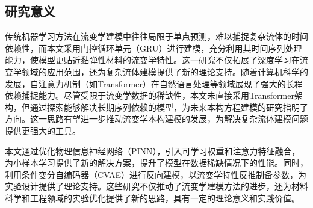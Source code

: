 \subsection{研究意义}
传统机器学习方法在流变学建模中往往局限于单点预测，难以捕捉复杂流体的时间依赖性，而本文采用门控循环单元（GRU）进行建模，充分利用其时间序列处理能力，使模型更贴近黏弹性材料的流变学特性。这一研究不仅拓展了深度学习在流变学领域的应用范围，还为复杂流体建模提供了新的理论支持。随着计算机科学的发展，自注意力机制（如Transformer）在自然语言处理等领域展现了强大的长程依赖捕捉能力。尽管受限于流变学数据的稀缺性，本文未直接采用Transformer架构，但通过探索能够解决长期序列依赖的模型，为未来本构方程建模的研究指明了方向。这一思路有望进一步推动流变学本构建模的发展，为解决复杂流体建模问题提供更强大的工具。

本文通过优化物理信息神经网络（PINN），引入可学习权重和注意力特征融合，为小样本学习提供了新的解决方案，提升了模型在数据稀缺情况下的性能。同时，利用条件变分自编码器（CVAE）进行反向建模，以流变学特性反推制备参数，为实验设计提供了理论支持。这些研究不仅推动了流变学建模方法的进步，还为材料科学和工程领域的实验优化提供了新的思路，具有一定的理论意义和实践价值。